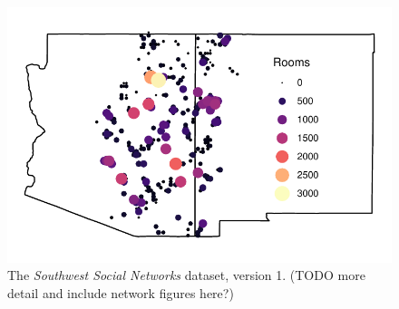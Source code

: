 \documentclass[11pt]{iopart}
\begin{document}
\begin{figure}[!htbp]
\centering
\includegraphics[width=.9\linewidth]{figures/site_distribution.pdf}
\caption{The \emph{Southwest Social Networks} dataset, version 1. (TODO more detail and include network figures here?)} 
\label{fig:network-plot}
\end{figure}
\end{document}
